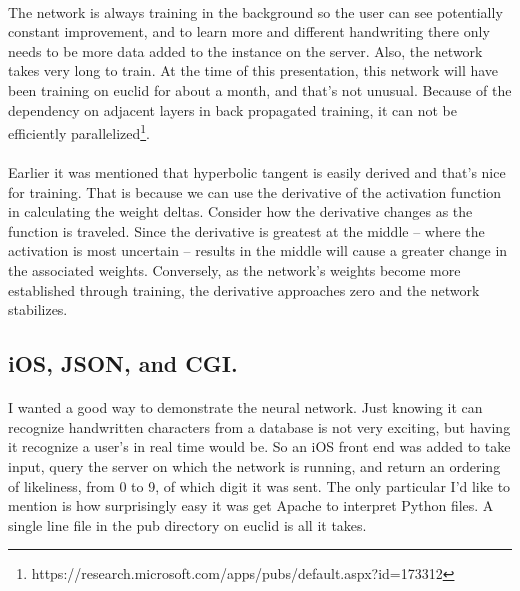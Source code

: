 \documentclass{article}
\begin{document}
    \paragraph{}The network is always training in the background so the user can 
    see potentially constant improvement, and to learn more and different 
    handwriting there only needs to be more data added to the instance on the 
    server. Also, the network takes very long to train. At the time of this 
    presentation, this network will have been training on euclid for about a 
    month, and that's not unusual. Because of the dependency on 
    adjacent layers in back propagated training, it can not be efficiently 
    parallelized\footnote{
    https://research.microsoft.com/apps/pubs/default.aspx?id=173312}.

    \paragraph{}Earlier it was mentioned that hyperbolic tangent is easily derived
    and that's nice for training. That is because we can use the derivative of the 
    activation function in calculating the weight deltas. Consider how the 
    derivative changes as the function is traveled. Since the derivative is 
    greatest at the middle -- where the activation is most uncertain -- results in
    the middle will cause a greater change in the associated weights. Conversely, 
    as the network's weights become more established through training, the 
    derivative approaches zero and the network stabilizes.

\subsection{iOS, JSON, and CGI.}

    \paragraph{}I wanted a good way to demonstrate the neural network. Just knowing
    it can recognize handwritten characters from a database is not very exciting, 
    but having it recognize a user's in real time would be. So an iOS front end was
    added to take input, query the server on which the network is running, and 
    return an ordering of likeliness, from 0 to 9, of which digit it was sent. The 
    only particular I'd like to mention is how surprisingly easy it was get Apache
    to interpret Python files. A single line file in the pub directory on euclid 
    is all it takes. \\
\end{document}
